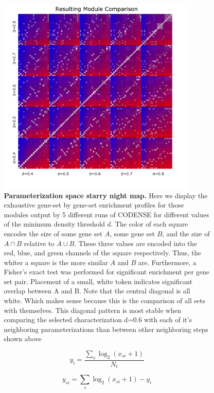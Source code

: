 \documentclass[10pt,letterpaper]{article}
\begin{document}
\begin{figure}[h]
\centering
\includegraphics[width=100mm]{Figures/moduleStaryNight}
\caption{\textbf{Parameterization space starry night map.} Here we display the exhaustive gene-set by gene-set enrichment profiles for those modules output by 5 different runs of CODENSE for different values of the minimum density threshold $d$. The color of each square encodes the size of some gene set $A$, some gene set $B$, and the size of $A\cap{}B$ relative to $A\cup{}B$. These three values are encoded into the red, blue, and green channels of the square respectively. Thus, the whiter a square is the more similar $A$ and $B$ are. Furthermore, a Fisher's exact test was performed for significant enrichment per gene set pair. Placement of a small, white token indicates significant overlap between A and B. 
Note that the central diagonal is all white. Which makes sense because this is the comparison of all sets with themselves. This diagonal pattern is most stable when comparing the selected characterization d=0.6 with each of it's neighboring parameterizations than between other neighboring steps shown above}
\label{fig:starryNight1}
\end{figure}

\begin{equation}\label{equation1}
y_{i} = \frac{\sum_{s} \log_2(x_{si} + 1)} {N_t}
\end{equation}

\begin{equation}\label{equation2}
y_{si}=\sum_{s} \log_2(x_{si} + 1)-y_i
\end{equation}
\end{document}
